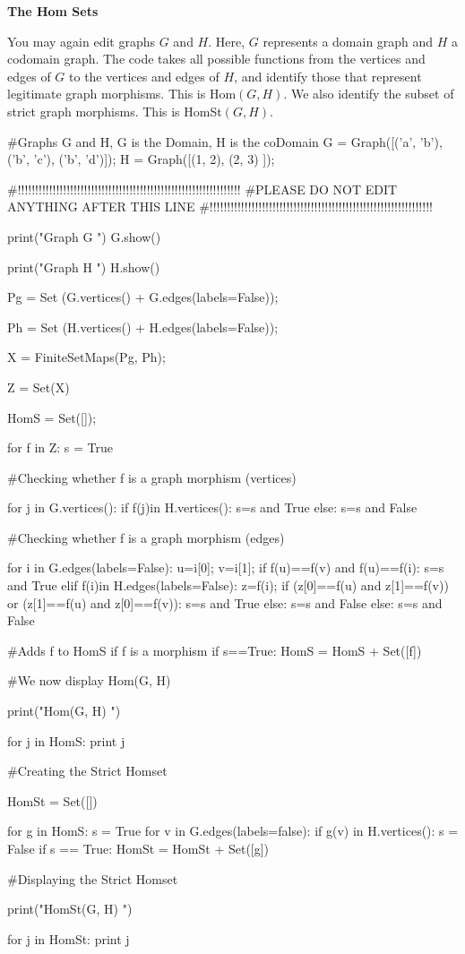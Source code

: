 \documentclass{ximera}
\begin{document}
\textbf{The Hom Sets}

You may again edit graphs $G$ and $H$.   Here, $G$ represents a domain graph and $H$ a codomain graph.  The code takes all possible functions from the vertices and edges of $G$ to the vertices and edges of $H$, and identify those that represent legitimate graph morphisms.  This is Hom$(G, H)$.  We also identify the subset of strict graph morphisms.  This is HomSt$(G,H)$.


\begin{sageCell}
#Graphs G and H, G is the Domain, H is the coDomain
G = Graph([('a', 'b'),('b', 'c'), ('b', 'd')]); 
H = Graph([(1, 2), (2, 3) ]); 

#!!!!!!!!!!!!!!!!!!!!!!!!!!!!!!!!!!!!!!!!!!!!!!!!!!!!!!!!!!!!!!!!
#PLEASE DO NOT EDIT ANYTHING AFTER THIS LINE
#!!!!!!!!!!!!!!!!!!!!!!!!!!!!!!!!!!!!!!!!!!!!!!!!!!!!!!!!!!!!!!!!

print("\n\n Graph G \n")
G.show()



print("\n\n Graph H \n\n")
H.show()


Pg = Set (G.vertices() + G.edges(labels=False)); 


Ph = Set (H.vertices() + H.edges(labels=False)); 

X = FiniteSetMaps(Pg, Ph); 

Z = Set(X)

HomS = Set([]); 

for f in Z:
    s = True

#Checking whether f is a graph morphism (vertices)

    for j in G.vertices():
        if f(j)in H.vertices():
            s=s and True
        else:
            s=s and False


#Checking whether f is a graph morphism (edges)

    for i in G.edges(labels=False):
        u=i[0];
        v=i[1];
        if f(u)==f(v) and f(u)==f(i):
            s=s and True
        elif f(i)in H.edges(labels=False):
            z=f(i);
            if (z[0]==f(u) and z[1]==f(v)) or (z[1]==f(u) and z[0]==f(v)):
                s=s and True
            else:
                s=s and False
        else: s=s and False

#Adds f to HomS if f is a morphism
    if s==True:
        HomS = HomS + Set([f])

#We now display Hom(G, H)

print("\n\n Hom(G, H) \n\n")


for j in HomS:
    print j

#Creating the Strict Homset

HomSt = Set([])

for g in HomS:
    s = True
    for v in G.edges(labels=false):
        if g(v) in H.vertices():
            s = False
    if s == True:
        HomSt = HomSt + Set([g])

#Displaying the Strict Homset

print("\n\n HomSt(G, H) \n\n")


for j in HomSt:
    print j
\end{sageCell}
\end{document}
